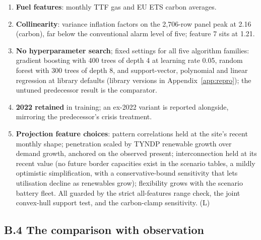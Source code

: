\begin{enumerate}
    by its yearly maximum flow), summed across borders. The predecessors'
    neighbour-synchronicity discount is dropped on evidence
    (Section~\ref{sec:features}); static within each year, blind to
    hour-by-hour congestion. (L)
    \item \textbf{Fuel features}: monthly TTF gas and EU ETS carbon
    averages.
    \item \textbf{Collinearity}: variance inflation factors on the 2,706-row
    panel peak at 2.16 (carbon), far below the conventional alarm level of
    five; feature 7 sits at 1.21.
    \item \textbf{No hyperparameter search}; fixed settings for all five
    algorithm families: gradient boosting with 400 trees of depth 4 at
    learning rate 0.05, random forest with 300 trees of depth 8, and
    support-vector, polynomial and linear regression at library defaults
    (library versions in Appendix~\ref{app:repro}); the untuned predecessor
    result is the comparator.
    \item \textbf{2022 retained} in training; an ex-2022 variant is
    reported alongside, mirroring the predecessor's crisis treatment.
    \item \textbf{Projection feature choices}: pattern correlations held
    at the site's recent monthly shape; penetration scaled by TYNDP
    renewable growth over demand growth, anchored on the observed present;
    interconnection held at its recent value (no future border capacities exist in the scenario tables, a mildly
optimistic simplification, with a
    conservative-bound sensitivity that lets utilisation decline as
    renewables grow); flexibility grows with the scenario battery fleet. All
    guarded by the strict all-features range check, the joint convex-hull
    support test, and the carbon-clamp sensitivity. (L)
\end{enumerate}

\subsection*{B.4 The comparison with observation}

